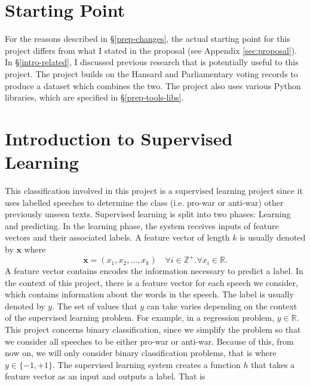 \documentclass[12pt,a4paper,twoside,openright]{report}
\begin{document}
\section{Starting Point} \label{prep-start}
For the reasons described in \S\ref{prep-changes}, the actual starting point for this project differs from what I stated in the proposal (see Appendix \ref{sec:proposal}). In \S\ref{intro-related}, I discussed previous research that is potentially useful to this project. The project builds on the Hansard \cite{hansard} and Parliamentary voting records to produce a dataset which combines the two. The project also uses various Python libraries, which are specified in \S\ref{prep-tools-libs}.
\section{Introduction to Supervised Learning} \label{prep-supervised} \label{supervised-learning}
This classification involved in this project is a supervised learning project since it uses labelled speeches to determine the class (i.e. pro-war or anti-war) other previously unseen texts. Supervised learning is split into two phases: Learning and predicting.
\newline
\newline
In the learning phase, the system receives inputs of feature vectors and their associated labels. A feature vector of length $k$ is usually denoted by $\mathbf{x}$ where 
\begin{equation}
	\mathbf{x} = (x_1, x_2, ..., x_k) \quad \forall i \in \mathbb{Z}^+ . \forall x_i \in \mathbb{R}.
\end{equation}
A feature vector contains encodes the information necessary to predict a label. In the context of this project, there is a feature vector for each speech we consider, which contains information about the words in the speech. The label is usually denoted by $y$. The set of values that $y$ can take varies depending on the context of the supervised learning problem. For example, in a regression problem, $y \in \mathbb{R}$. This project concerns binary classification, since we simplify the problem so that we consider all speeches to be either pro-war or anti-war. Because of this, from now on, we will only consider binary classification problems, that is where $y \in \{-1, +1\}$.
\newline
\newline
The supervised learning system creates a function $h$ that takes a feature vector as an input and outputs a label. That is
\end{document}
